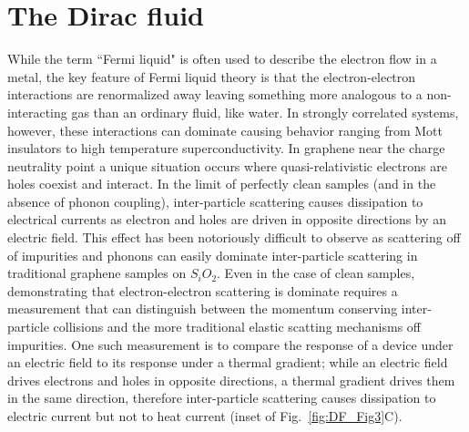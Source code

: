 \chapter{The Dirac fluid}
\label{ch:the_Dirac_fluid}

While the term ``Fermi liquid" is often used to describe the electron flow in a metal, the key feature of Fermi liquid theory is that the electron-electron interactions are renormalized away leaving something more analogous to a non-interacting gas than an ordinary fluid, like water. In strongly correlated systems, however, these interactions can dominate causing behavior ranging from Mott insulators to high temperature superconductivity. In graphene near the charge neutrality point a unique situation occurs where quasi-relativistic electrons are holes coexist and interact. In the limit of perfectly clean samples (and in the absence of phonon coupling), inter-particle scattering causes dissipation to electrical currents as electron and holes are driven in opposite directions by an electric field. This effect has been notoriously difficult to observe as scattering off of impurities and phonons can easily dominate inter-particle scattering in traditional graphene samples on $S_iO_2$. Even in the case of clean samples, demonstrating that electron-electron scattering is dominate requires a measurement that can distinguish between the momentum conserving inter-particle collisions and the more traditional elastic scatting mechanisms off impurities. One such measurement is to compare the response of a device under an electric field to its response under a thermal gradient; while an electric field drives electrons and holes in opposite directions, a thermal gradient drives them in the same direction, therefore inter-particle scattering causes dissipation to electric current but not to heat current (inset of Fig.~\ref{fig:DF_Fig3}C).

